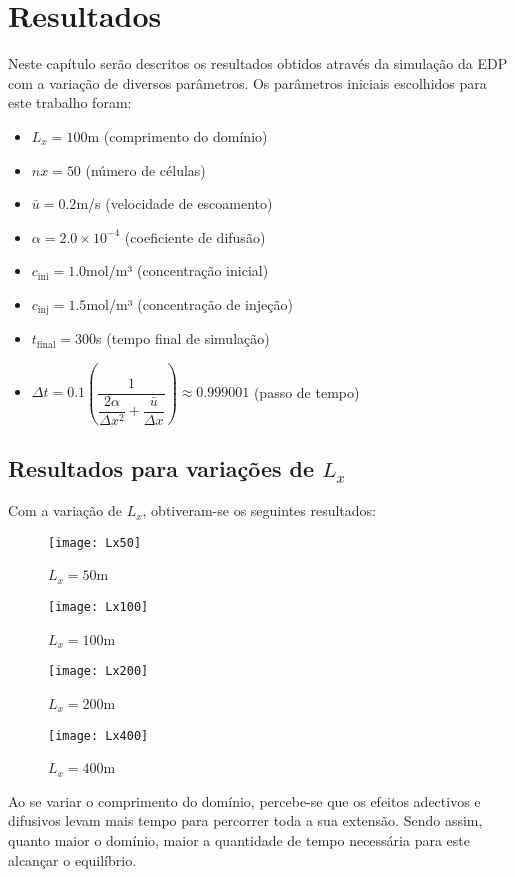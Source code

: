 \chapter{Resultados}
Neste capítulo serão descritos os resultados obtidos através da simulação da
EDP com a variação de diversos parâmetros. Os parâmetros iniciais escolhidos
para este trabalho foram:
\begin{itemize}
    \item $L_x = 100$m (comprimento do domínio)
    \item $nx = 50$ (número de células)
    \item $\bar{u} = 0.2$m/s (velocidade de escoamento)
    \item $\alpha = 2.0\times10^{-4}$ (coeficiente de difusão)
    \item $c_{\text{ini}} = 1.0$mol/m³ (concentração inicial)
    \item $c_{\text{inj}} = 1.5$mol/m³ (concentração de injeção)
    \item $t_\text{final} = 300$s  (tempo final de simulação)
    \item $\Delta t = 0.1\left( \dfrac{1}{\dfrac{2\alpha}{\Delta x^2} +
           \dfrac{\bar{u}}{\Delta x}} \right) \approx 0.999001$ (passo de tempo)
\end{itemize}

\section{Resultados para variações de $L_x$}
Com a variação de $L_x$, obtiveram-se os seguintes resultados:
\begin{figure}[H]
    \centering
    \texttt{[image: Lx50]}
    \caption{$L_x = 50$m}
\end{figure}
\begin{figure}[H]
    \centering
    \texttt{[image: Lx100]}
    \caption{$L_x = 100$m}
\end{figure}
\begin{figure}[H]
    \centering
    \texttt{[image: Lx200]}
    \caption{$L_x = 200$m}
\end{figure}
\begin{figure}[H]
    \centering
    \texttt{[image: Lx400]}
    \caption{$L_x = 400$m}
\end{figure}

Ao se variar o comprimento do domínio, percebe-se que os efeitos adectivos e
difusivos levam mais tempo para percorrer toda a sua extensão. Sendo assim,
quanto maior o domínio, maior a quantidade de tempo necessária para este
alcançar o equilíbrio.



